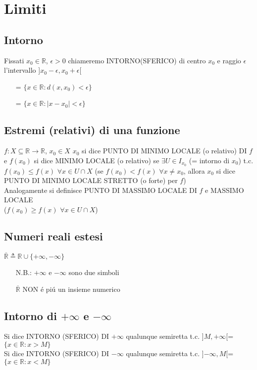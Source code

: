 \chapter{Limiti}
\section{Intorno}
Fissati $x_0 \in \mathbb{R}$, $\epsilon >0$ chiameremo INTORNO(SFERICO) di centro $x_0$ e raggio $\epsilon$ l'intervallo ]$x_0-\epsilon ,x_0+\epsilon$[
\begin{itemize}
\item[=]$\{x \in \mathbb{R}: d(x,x_0)<\epsilon \}$
\item[=]$\{x \in \mathbb{R}: |x-x_0|<\epsilon \}$
\end{itemize}
\section{Estremi (relativi) di una funzione}
$f:X \subseteq \mathbb{R} \rightarrow \mathbb{R}$, $x_0 \in X$ $x_0$ si dice PUNTO DI MINIMO LOCALE (o relativo) DI $f$ e $f(x_0)$ si dice MINIMO LOCALE (o relativo) se $\exists U \in I_{x_0}$ (= intorno di $x_0$) t.c. $f(x_0) \le f(x)$ $\forall x \in U \cap X$ (se $f(x_0)<f(x)$ $\forall x \not= x_0$, allora $x_0$ si dice PUNTO DI MINIMO LOCALE STRETTO (o forte) per $f$) \\
Analogamente si definisce PUNTO DI MASSIMO LOCALE DI $f$ e MASSIMO LOCALE \\ ($f(x_0) \ge f(x)$ $\forall x \in U \cap X$)
\section{Numeri reali estesi}
$\overline{\mathbb{R}} \triangleq \mathbb{R} \cup \{+\infty,-\infty\}$
\begin{itemize}
\item[N.B.:]$+\infty$ e $-\infty$ sono due simboli 
\item[]$\overline{\mathbb{R}}$ NON \'e pi\'u un insieme numerico 
\end{itemize}
\section{Intorno di $+\infty$ e $-\infty$ }
Si dice INTORNO (SFERICO) DI $+\infty$ qualunque semiretta t.c. ]$M,+\infty$[=$\{x \in \mathbb{R}: x>M\}$ \\
Si dice INTORNO (SFERICO) DI $-\infty$ qualunque semiretta t.c. ]$-\infty ,M$[=$\{x \in \mathbb{R}: x<M\}$
